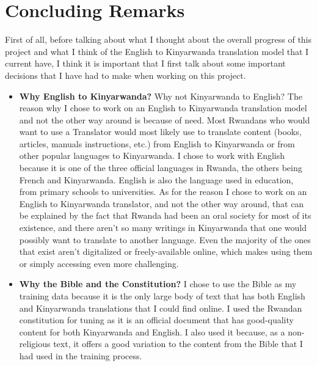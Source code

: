 \chapter{Concluding Remarks}


First of all, before talking about what I thought about the overall progress of this project and what I think of the English to Kinyarwanda translation model that I current have, I think it is important that I first talk about some important decisions that I have had to make when working on this project.

\begin{itemize}

    \item \textbf{Why English to Kinyarwanda?} Why not Kinyarwanda to English? The reason why I chose to work on an English to Kinyarwanda translation model and not the other way around is because of need. Most Rwandans who would want to use a Translator would most likely use to translate content (books, articles, manuals instructions, etc.) from English to Kinyarwanda or from other popular languages to Kinyarwanda. I chose to work with English because it is one of the three official languages in Rwanda, the others being French and Kinyarwanda. English is also the language used in education, from primary schools to universities\cite{Samuelson2010}. As for the reason I chose to work on an English to Kinyarwanda translator, and not the other way around, that can be explained by the fact that Rwanda had been an oral society for most of its existence, and there aren't so many writings in Kinyarwanda that one would possibly want to translate to another language\cite[p. 59]{adekunle2007culture}. Even the majority of the ones that exist aren't digitalized or freely-available online, which makes using them or simply accessing even more challenging. %
    \clearpage

    \item \textbf{Why the Bible and the Constitution?} I chose to use the Bible as my training data because it is the only large body of text that has both English and Kinyarwanda translations that I could find online. I used the Rwandan constitution for tuning as it is an official document that has good-quality content for both Kinyarwanda and English. I also used it because, as a non-religious text, it offers a good variation to the content from the Bible that I had used in the training process. 


\end{itemize}
